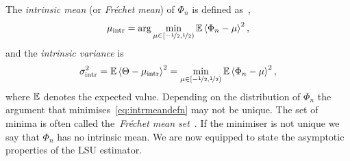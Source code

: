 \documentclass[journal]{IEEEtran}
\begin{document}
The \emph{intrinsic mean} (or \emph{Fr\'{e}chet mean}) of $\Phi_n$ is defined as~\cite{McKilliam_mean_dir_est_sq_arc_length2010,bwhk07a,Bhattacharya_int_ext_means_2003,Bhattacharya_int_ext_means_2005},
\begin{equation}\label{eq:intrmeandefn}
 \mu_{\text{intr}}  = \arg \min_{\mu \in [-\nicefrac{1}{2}, \nicefrac{1}{2})} {\mathbb E} \left\langle \Phi_n - \mu \right\rangle^2, 
\end{equation}
and the \emph{intrinsic variance} is
\[
\sigma_{\text{intr}}^2 = {\mathbb E}\left\langle \Theta - \mu_{\text{intr}} \right\rangle^2 = \min_{\mu \in [-\nicefrac{1}{2}, \nicefrac{1}{2})} {\mathbb E} \left\langle \Phi_n - \mu \right\rangle^2,
\]
where ${\mathbb E}$ denotes the expected value.  Depending on the distribution of $\Phi_n$ the argument that minimises~\eqref{eq:intrmeandefn} may not be unique.  The set of minima is often called the~\emph{Fr\'{e}chet mean set}~\cite{Bhattacharya_int_ext_means_2003,Bhattacharya_int_ext_means_2005}.  If the minimiser is not unique we say that $\Phi_n$ has no intrinsic mean.  We are now equipped to state the asymptotic properties of the LSU estimator.


 
\end{document}
